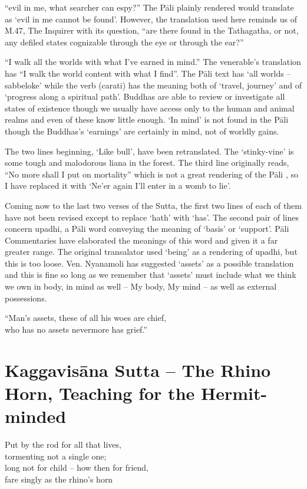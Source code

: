    “evil in me, what searcher can espy?” The P\=ali  plainly rendered would translate as `evil in me cannot be found'. However, the translation used here reminds us of M.47, The Inquirer with its question, “are there found in the Tathagatha, or not, any defiled states cognizable through the eye or through the ear?”
   
   “I walk all the worlds with what I've earned in mind.” The venerable's translation has “I walk the world content with what I find”. The P\=ali  text has `all worlds – sabbeloke' while the verb (carati) has the meaning both of `travel, journey' and of `progress along a spiritual path'. Buddhas are able to review or investigate all states of existence though we usually have access only to the human and animal realms and even of these know little enough. `In mind' is not found in the P\=ali  though the Buddhas's `earnings' are certainly in mind, not of worldly gains.
   
   The two lines beginning, `Like bull', have been retranslated. The `stinky-vine' is some tough and malodorous liana in the forest. The third line originally reads, “No more shall I put on mortality” which is not a great rendering of the P\=ali , so I have replaced it with `Ne'er again I'll enter in a womb to lie'.
   
   Coming now to the last two verses of the Sutta, the first two lines of each of them have not been revised except to replace `hath' with `has'. The second pair of lines concern upadhi, a P\=ali  word conveying the meaning of `basis' or `support'. P\=ali  Commentaries have elaborated the meanings of this word and given it a far greater range. The original transalator used `being' as a rendering of upadhi, but this is too loose. Ven. Nyanamoli has suggested `assets' as a possible translation and this is fine so long as we remember that `assets' must include what we think we own in body, in mind as well – My body, My mind – as well as external possessions.
 \begin{MyDescription}[]{}
 “Man's assets, these of all his woes are chief,\\
   who has no assets nevermore has grief.”
 \end{MyDescription}  
  
\chapter{Kaggavis\=ana Sutta -- The Rhino Horn, Teaching for the Hermit-minded}
\begin{MyDescription}{}  	
Put by the rod for all that lives,\\
tormenting not a single one;\\
long not for child – how then for friend,\\
fare singly as the rhino's horn
\end{MyDescription}  

